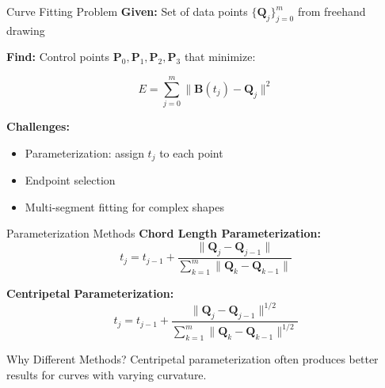 \documentclass{beamer}
\begin{document}
\begin{frame}{Curve Fitting Problem}
\textbf{Given:} Set of data points $\{\mathbf{Q}_j\}_{j=0}^{m}$ from freehand drawing

\textbf{Find:} Control points $\mathbf{P}_0, \mathbf{P}_1, \mathbf{P}_2, \mathbf{P}_3$ that minimize:

\begin{equation*}
E = \sum_{j=0}^{m} \|\mathbf{B}(t_j) - \mathbf{Q}_j\|^2
\end{equation*}

\vspace{1em}

\textbf{Challenges:}
\begin{itemize}
    \item Parameterization: assign $t_j$ to each point
    \item Endpoint selection
    \item Multi-segment fitting for complex shapes
\end{itemize}
\end{frame}

\begin{frame}{Parameterization Methods}
\textbf{Chord Length Parameterization:}
\begin{equation*}
t_j = t_{j-1} + \frac{\|\mathbf{Q}_j - \mathbf{Q}_{j-1}\|}{\sum_{k=1}^{m}\|\mathbf{Q}_k - \mathbf{Q}_{k-1}\|}
\end{equation*}

\textbf{Centripetal Parameterization:}
\begin{equation*}
t_j = t_{j-1} + \frac{\|\mathbf{Q}_j - \mathbf{Q}_{j-1}\|^{1/2}}{\sum_{k=1}^{m}\|\mathbf{Q}_k - \mathbf{Q}_{k-1}\|^{1/2}}
\end{equation*}

\vspace{0.5em}

\begin{alertblock}{Why Different Methods?}
Centripetal parameterization often produces better results for curves with varying curvature.
\end{alertblock}
\end{frame}
\end{document}

